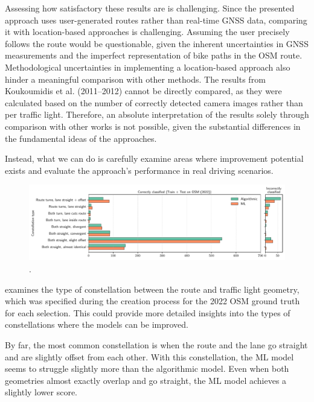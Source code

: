 Assessing how satisfactory these results are is challenging. Since the presented approach uses user-generated routes rather than real-time GNSS data, comparing it with location-based approaches is challenging. Assuming the user precisely follows the route would be questionable, given the inherent uncertainties in GNSS measurements and the imperfect representation of bike paths in the OSM route. Methodological uncertainties in implementing a location-based approach also hinder a meaningful comparison with other methods. The results from Koukoumidis et al. (2011–2012) \cite{koukoumidis_signalguru_2011, koukoumidis_leveraging_2012} cannot be directly compared, as they were calculated based on the number of correctly detected camera images rather than per traffic light. Therefore, an absolute interpretation of the results solely through comparison with other works is not possible, given the substantial differences in the fundamental ideas of the approaches.

Instead, what we can do is carefully examine areas where improvement potential exists and evaluate the approach's performance in real driving scenarios.

\begin{figure}[t]
\centering 
\includegraphics[width=\linewidth]{images/matching-constellations-osm-old.pdf}
\caption{.}
\label{fig:matching-constellations-osm}
\end{figure}

 examines the type of constellation between the route and traffic light geometry, which was specified during the creation process for the 2022 OSM ground truth for each selection. This could provide more detailed insights into the types of constellations where the models can be improved.

By far, the most common constellation is when the route and the lane go straight and are slightly offset from each other. With this constellation, the ML model seems to struggle slightly more than the algorithmic model. Even when both geometries almost exactly overlap and go straight, the ML model achieves a slightly lower score.

